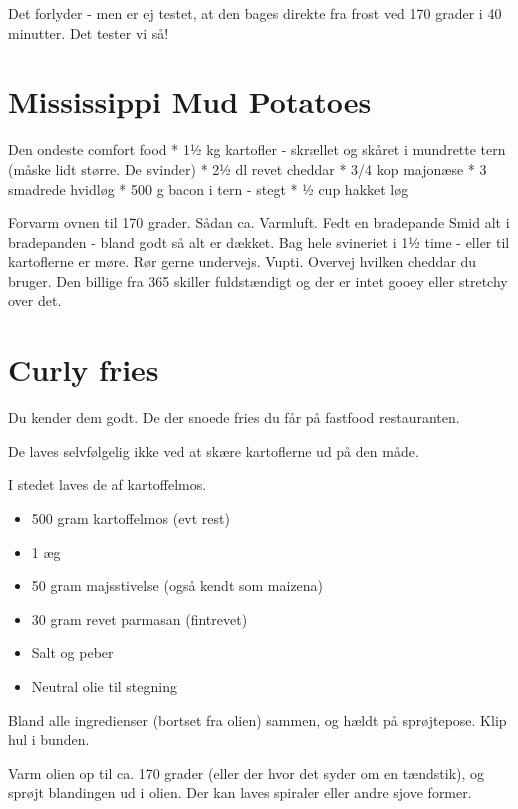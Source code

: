 \documentclass[
  letterpaper,
  DIV=11,
  numbers=noendperiod]{scrreprt}
\providecommand{\tightlist}{%
  \setlength{\itemsep}{0pt}\setlength{\parskip}{0pt}}\usepackage{longtable,booktabs,array}
\begin{document}
Det forlyder - men er ej testet, at den bages direkte fra frost ved 170
grader i 40 minutter. Det tester vi så!

\hypertarget{mississippi-mud-potatoes}{%
\section{Mississippi Mud Potatoes}\label{mississippi-mud-potatoes}}

Den ondeste comfort food * 1½ kg kartofler - skrællet og skåret i
mundrette tern (måske lidt større. De svinder) * 2½ dl revet cheddar *
3/4 kop majonæse * 3 smadrede hvidløg * 500 g bacon i tern - stegt * ½
cup hakket løg

Forvarm ovnen til 170 grader. Sådan ca. Varmluft. Fedt en bradepande
Smid alt i bradepanden - bland godt så alt er dækket. Bag hele svineriet
i 1½ time - eller til kartoflerne er møre. Rør gerne undervejs. Vupti.
Overvej hvilken cheddar du bruger. Den billige fra 365 skiller
fuldstændigt og der er intet gooey eller stretchy over det.

\hypertarget{curly-fries}{%
\section{Curly fries}\label{curly-fries}}

Du kender dem godt. De der snoede fries du får på fastfood restauranten.

De laves selvfølgelig ikke ved at skære kartoflerne ud på den måde.

I stedet laves de af kartoffelmos.

\begin{itemize}
\tightlist
\item
  500 gram kartoffelmos (evt rest)
\item
  1 æg
\item
  50 gram majsstivelse (også kendt som maizena)
\item
  30 gram revet parmasan (fintrevet)
\item
  Salt og peber
\item
  Neutral olie til stegning
\end{itemize}

Bland alle ingredienser (bortset fra olien) sammen, og hældt på
sprøjtepose. Klip hul i bunden.

Varm olien op til ca. 170 grader (eller der hvor det syder om en
tændstik), og sprøjt blandingen ud i olien. Der kan laves spiraler eller
andre sjove former.
\end{document}
